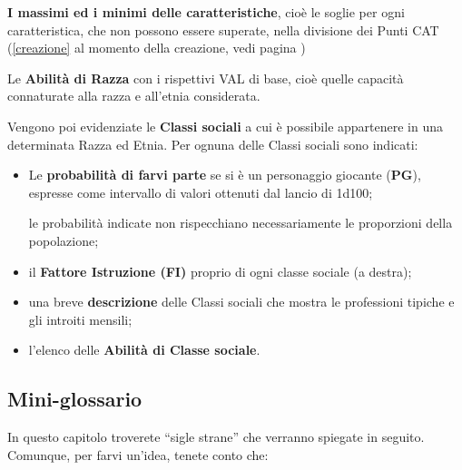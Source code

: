 \textbf{I massimi ed i minimi delle caratteristiche}, cio\`e le
soglie per ogni caratteristica, che non possono essere superate, nella
divisione dei Punti CAT (\ref{creazione} al momento della creazione,
vedi pagina \pageref{creazione})
  
Le \textbf{Abilit\`a di Razza} con i rispettivi VAL di base, cio\`e
quelle capacit\`a connaturate alla razza e all'etnia considerata.

Vengono poi evidenziate le \textbf{Classi sociali} a cui \`e
possibile appartenere in una determinata Razza ed Etnia. Per ognuna
delle Classi sociali sono indicati:

\begin{itemize}

\item Le \textbf{probabilit\`a di farvi parte} se si \`e un
  personaggio giocante (\textbf{PG}), espresse come intervallo di
  valori ottenuti dal lancio di 1d100; 
  
  le probabilit\`a indicate non rispecchiano necessariamente le
  proporzioni della popolazione;
\item il \textbf{Fattore Istruzione (FI)} proprio di ogni classe
  sociale (a destra);
\item una breve \textbf{descrizione} delle Classi sociali che mostra
  le professioni tipiche e gli introiti mensili;
\item l'elenco delle \textbf{Abilit\`a di Classe sociale}.
\end{itemize}

\subsection*{Mini-glossario}

In questo capitolo troverete ``sigle strane'' che verranno spiegate in
seguito. Comunque, per farvi un'idea, tenete conto che:

